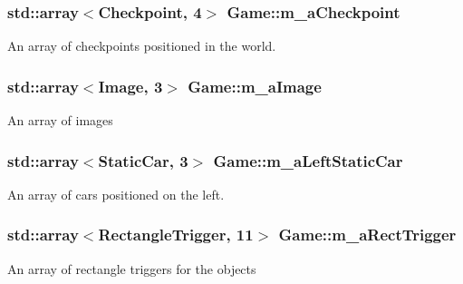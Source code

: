 \subsubsection[{\texorpdfstring{m\+\_\+a\+Checkpoint}{m_aCheckpoint}}]{\setlength{\rightskip}{0pt plus 5cm}std\+::array$<${\bf Checkpoint}, 4$>$ Game\+::m\+\_\+a\+Checkpoint\hspace{0.3cm}{\ttfamily [private]}}\hypertarget{class_game_ade427c88bcff6dd2e4b7e78a6db93f04}{}\label{class_game_ade427c88bcff6dd2e4b7e78a6db93f04}
An array of checkpoints positioned in the world. 
\subsubsection[{\texorpdfstring{m\+\_\+a\+Image}{m_aImage}}]{\setlength{\rightskip}{0pt plus 5cm}std\+::array$<${\bf Image}, 3$>$ Game\+::m\+\_\+a\+Image\hspace{0.3cm}{\ttfamily [private]}}\hypertarget{class_game_a5025f591142de524119d0dcc99300d3b}{}\label{class_game_a5025f591142de524119d0dcc99300d3b}
An array of images 
\subsubsection[{\texorpdfstring{m\+\_\+a\+Left\+Static\+Car}{m_aLeftStaticCar}}]{\setlength{\rightskip}{0pt plus 5cm}std\+::array$<${\bf Static\+Car}, 3$>$ Game\+::m\+\_\+a\+Left\+Static\+Car\hspace{0.3cm}{\ttfamily [private]}}\hypertarget{class_game_a664151ff15f6aaecc56b1c35e7fb05df}{}\label{class_game_a664151ff15f6aaecc56b1c35e7fb05df}
An array of cars positioned on the left. 
\subsubsection[{\texorpdfstring{m\+\_\+a\+Rect\+Trigger}{m_aRectTrigger}}]{\setlength{\rightskip}{0pt plus 5cm}std\+::array$<${\bf Rectangle\+Trigger}, 11$>$ Game\+::m\+\_\+a\+Rect\+Trigger\hspace{0.3cm}{\ttfamily [private]}}\hypertarget{class_game_a2065f8dee8f173a73ef904525ab6823e}{}\label{class_game_a2065f8dee8f173a73ef904525ab6823e}
An array of rectangle triggers for the objects 
